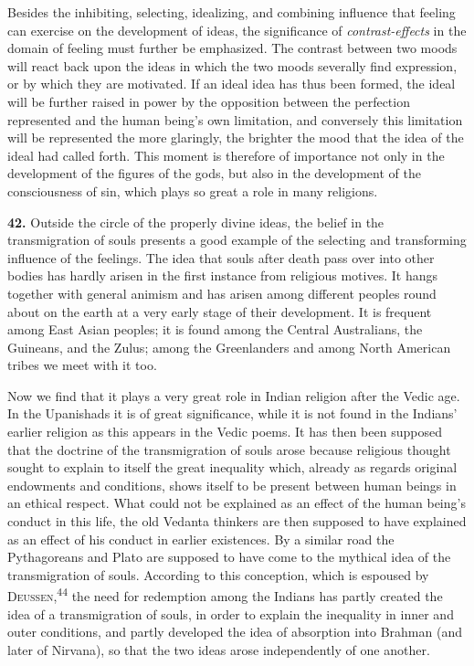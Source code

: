 \documentclass[12pt,a4paper]{book}
\newcommand{\opage}[1]{\marginnote{\footnotesize\textit{[#1]}}}
\begin{document}
Besides the inhibiting, selecting, idealizing, and combining influence that feeling can exercise
on the development of ideas, the significance of \emph{contrast-effects} in the domain of
feeling must further be emphasized. The contrast between two moods will react back upon the
ideas in which the two moods severally find expression, or by which they are motivated. If an
ideal idea has thus been formed, the ideal will be further raised in power by the opposition
between the perfection represented and the human being's own limitation, and conversely this
limitation will be represented the more glaringly, the brighter the mood that the idea of the
ideal had called forth. This moment is therefore of importance not only in the development of
the figures of the gods, but also in the development of the consciousness of sin, which plays so
great a role in many religions.

\medskip

\noindent\textbf{42.} Outside the circle of the properly divine ideas, the belief in
the transmigration of souls presents a good example of the selecting and transforming
influence of the feelings. The idea that souls after death pass over into other bodies
has hardly arisen in the first 
\opage{98}instance from religious motives. It hangs together with
general animism and has arisen among different peoples round about on the earth at a
very early stage of their development. It is frequent among East Asian peoples; it is
found among the Central Australians, the Guineans, and the Zulus; among the Greenlanders
and among North American tribes we meet with it too.

Now we find that it plays a very great role in Indian religion after the Vedic age. In
the Upanishads it is of great significance, while it is not found in the Indians' earlier
religion as this appears in the Vedic poems. It has then been supposed that the doctrine
of the transmigration of souls arose because religious thought sought to explain to itself
the great inequality which, already as regards original endowments and conditions, shows
itself to be present between human beings in an ethical respect. What could not be
explained as an effect of the human being's conduct in this life, the old Vedanta thinkers
are then supposed to have explained as an effect of his conduct in earlier existences. By
a similar road the Pythagoreans and Plato are supposed to have come to the mythical idea of
the transmigration of souls. According to this conception, which is espoused by
\textsc{Deussen},\textsuperscript{44} the need for redemption among the Indians has partly
created the idea of a transmigration of souls, in order to explain the inequality in inner
and outer conditions, and partly developed the idea of absorption into Brahman (and later of
Nirvana), so that the two ideas arose independently of one another.
\end{document}
